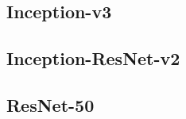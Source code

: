 \subsection{Inception-v3}

\cite{Inception-v3}

\subsection{Inception-ResNet-v2}


\cite{Inception-ResNet}


\subsection{ResNet-50}

\cite{ResNet}



